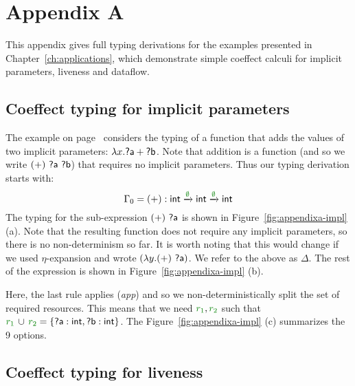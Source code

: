 
\chapter{Appendix A} 
\label{ch:appendix} 

This appendix gives full typing derivations for the examples presented in Chapter~\ref{ch:applications},
which demonstrate simple coeffect calculi for implicit parameters, liveness and dataflow.


\section{Coeffect typing for implicit parameters}
\label{sec:appendixa-implicit} 

The example on page~\pageref{pg:applications-flat-paramsex} considers the typing of a function that
adds the values of two implicit parameters: $\lambda x.\ident{?a} + \ident{?b}$. Note that addition
is a function (and so we write $(+)~\ident{?a}~\ident{?b}$) that requires no implicit parameters.
Thus our typing derivation starts with: 
%
\begin{equation*}
\Gamma_0 = (+):\ident{int}\xrightarrow{\cclrd{\emptyset}}\ident{int}\xrightarrow{\cclrd{\emptyset}}\ident{int}
\end{equation*}
%
The typing for the sub-expression $(+)~\ident{?a}$ is shown in Figure~\ref{fig:appendixa-impl} (a).
Note that the resulting function does not require any implicit parameters, so there is no non-determinism so far.
It is worth noting that this would change if we used $\eta$-expansion and wrote $(\lambda y.(+)~\ident{?a})$.
We refer to the above as $\Delta$. The rest of the expression is shown in Figure~\ref{fig:appendixa-impl} (b).

Here, the last rule applies (\emph{app}) and so we non-deterministically split the set of required resources.
This means that we need $\cclrd{r_1}, \cclrd{r_2}$ such that $\cclrd{r_1}\,\cup\,\cclrd{r_2}=\{\ident{?a}:\ident{int}, \ident{?b}:\ident{int} \}$.
The Figure~\ref{fig:appendixa-impl} (c) summarizes the 9 options.


\section{Coeffect typing for liveness}
\label{sec:appendixa-liveness} 

